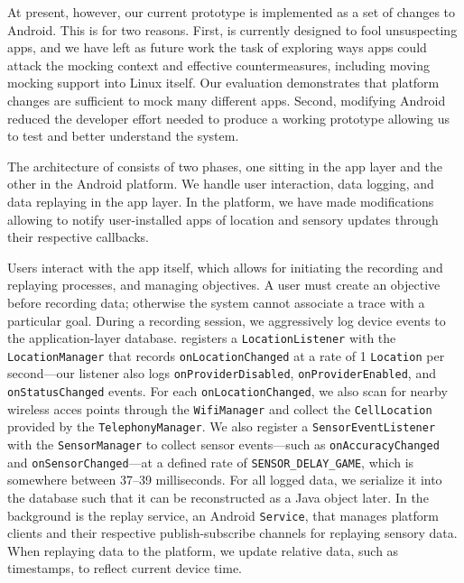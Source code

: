 At present, however, our current \PocketMocker{} prototype is implemented as
a set of changes to Android. This is for two reasons. First, \PocketMocker{}
is currently designed to fool unsuspecting apps, and we have left as future
work the task of exploring ways apps could attack the mocking context and
effective \PocketMocker{} countermeasures, including moving mocking support
into Linux itself. Our evaluation demonstrates that platform changes are
sufficient to mock many different apps. Second, modifying Android reduced the
developer effort needed to produce a working prototype allowing us to test
and better understand the system.


The architecture of \PocketMocker{} consists of two phases, one sitting in the
app layer and the other in the Android platform. We handle user 
interaction, data logging, and data replaying in the app layer.
In the platform, we have made modifications allowing \PocketMocker{} to notify 
user-installed apps of location and sensory updates through their respective 
callbacks.

Users interact with the app itself, which allows for initiating the
recording and replaying processes, and managing objectives. A user must
create an objective before recording data; otherwise the system cannot
associate a trace with a particular goal. During a recording session, we
aggressively log device events to the application-layer database. 
\PocketMocker{} registers a \texttt{LocationListener} with the
\texttt{LocationManager} that records \texttt{onLocationChanged} at a rate of
1 \texttt{Location} per second---our listener also logs
\texttt{onProviderDisabled}, \texttt{onProviderEnabled}, and
\texttt{onStatusChanged} events. For each \texttt{onLocationChanged}, we also
scan for nearby wireless acces points through the \texttt{WifiManager} and
collect the \texttt{CellLocation} provided by the \texttt{TelephonyManager}.
We also register a \texttt{SensorEventListener} with the
\texttt{SensorManager} to collect sensor events---such as
\texttt{onAccuracyChanged} and \texttt{onSensorChanged}---at a defined rate
of \texttt{SENSOR\_DELAY\_GAME}, which is somewhere between 37--39
milliseconds. For all logged data, we serialize it into the database such
that it can be reconstructed as a Java object later. In the background is the 
replay service, an Android \texttt{Service}, that manages platform clients and 
their respective publish-subscribe channels for replaying sensory data. When 
replaying data to the platform, we update relative data, such as timestamps, 
to reflect current device time.

